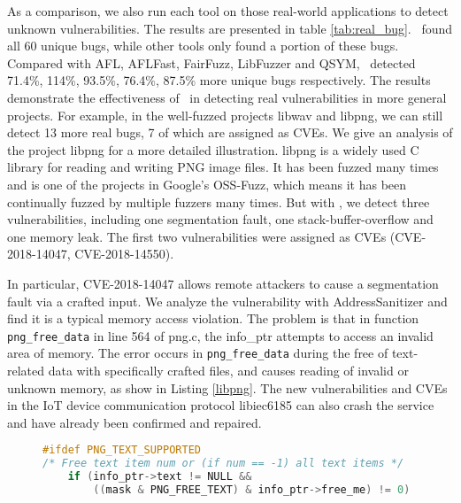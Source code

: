 As a comparison, we also run each tool on those real-world applications to detect unknown vulnerabilities. The results are presented in table \ref{tab:real_bug}. \toolThree ~found all 60 unique bugs, while other tools only found a portion of these bugs. Compared with AFL, AFLFast, FairFuzz, LibFuzzer and QSYM, \toolThree ~detected 71.4\%, 114\%, 93.5\%, 76.4\%, 87.5\% more unique bugs respectively.
The results demonstrate the effectiveness of \toolThree ~in detecting real vulnerabilities in more general projects. For example, in the well-fuzzed projects libwav and libpng, we can still detect 13 more real bugs, 7 of which are assigned as CVEs. We give an analysis of the project libpng for a more detailed illustration. 
libpng is a widely used C library for reading and writing PNG image files. It has been fuzzed many times and is one of the projects in Google's OSS-Fuzz, which means it has been continually fuzzed by multiple fuzzers many times. But with \toolThree, we detect three vulnerabilities, including one segmentation fault, one stack-buffer-overflow and one memory leak. The first two vulnerabilities were assigned as CVEs (CVE-2018-14047, CVE-2018-14550). 
 


In particular, CVE-2018-14047 allows remote attackers to cause a segmentation fault via a crafted input. We analyze the vulnerability with AddressSanitizer and find it is a typical memory access violation. 
The problem is that in function \texttt{png\_free\_data} in line 564 of png.c, the info\_ptr attempts to access an invalid area of memory.
The error occurs in \texttt{png\_free\_data} during the free of text-related data with specifically crafted files, and causes reading of invalid or unknown memory, as show in Listing \ref{libpng}.
The new vulnerabilities and CVEs in the IoT device communication protocol libiec6185 can also crash the service and have already been confirmed and  repaired.

\begin{figure}[!htbp]
\begin{lstlisting}[language = C, numbers = none,
        commentstyle=\color{red!50!green!50!blue!50},frame=shadowbox,
        rulesepcolor=\color{red!20!green!20!blue!20},basicstyle=\ttfamily,breaklines=true,
        extendedchars=true,caption={The error code of libpng for CVE-2018-14047 },label={libpng}]
#ifdef PNG_TEXT_SUPPORTED
/* Free text item num or (if num == -1) all text items */
   	if (info_ptr->text != NULL &&
       	((mask & PNG_FREE_TEXT) & info_ptr->free_me) != 0)
\end{lstlisting} 
\end{figure}



